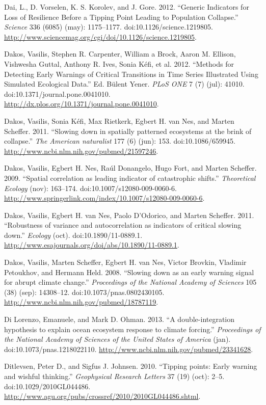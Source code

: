 \documentclass[author-year, review]{elsarticle} %
\begin{document}
Dai, L., D. Vorselen, K. S. Korolev, and J. Gore. 2012. ``Generic
Indicators for Loss of Resilience Before a Tipping Point Leading to
Population Collapse.'' \emph{Science} 336 (6085) (may): 1175--1177.
doi:10.1126/science.1219805.
\url{http://www.sciencemag.org/cgi/doi/10.1126/science.1219805}.

Dakos, Vasilis, Stephen R. Carpenter, William a Brock, Aaron M. Ellison,
Vishwesha Guttal, Anthony R. Ives, Sonia Kéfi, et al. 2012. ``Methods
for Detecting Early Warnings of Critical Transitions in Time Series
Illustrated Using Simulated Ecological Data.'' Ed. Bülent Yener.
\emph{PLoS ONE} 7 (7) (jul): 41010. doi:10.1371/journal.pone.0041010.
\url{http://dx.plos.org/10.1371/journal.pone.0041010}.

Dakos, Vasilis, Sonia Kéfi, Max Rietkerk, Egbert H. van Nes, and Marten
Scheffer. 2011. ``Slowing down in spatially patterned ecosystems at the
brink of collapse.'' \emph{The American naturalist} 177 (6) (jun): 153.
doi:10.1086/659945. \url{http://www.ncbi.nlm.nih.gov/pubmed/21597246}.

Dakos, Vasilis, Egbert H. Nes, Raúl Donangelo, Hugo Fort, and Marten
Scheffer. 2009. ``Spatial correlation as leading indicator of
catastrophic shifts.'' \emph{Theoretical Ecology} (nov): 163--174.
doi:10.1007/s12080-009-0060-6.
\url{http://www.springerlink.com/index/10.1007/s12080-009-0060-6}.

Dakos, Vasilis, Egbert H. van Nes, Paolo D'Odorico, and Marten Scheffer.
2011. ``Robustness of variance and autocorrelation as indicators of
critical slowing down.'' \emph{Ecology} (oct). doi:10.1890/11-0889.1.
\url{http://www.esajournals.org/doi/abs/10.1890/11-0889.1}.

Dakos, Vasilis, Marten Scheffer, Egbert H. van Nes, Victor Brovkin,
Vladimir Petoukhov, and Hermann Held. 2008. ``Slowing down as an early
warning signal for abrupt climate change.'' \emph{Proceedings of the
National Academy of Sciences} 105 (38) (sep): 14308--12.
doi:10.1073/pnas.0802430105.
\url{http://www.ncbi.nlm.nih.gov/pubmed/18787119}.

Di Lorenzo, Emanuele, and Mark D. Ohman. 2013. ``A double-integration
hypothesis to explain ocean ecosystem response to climate forcing.''
\emph{Proceedings of the National Academy of Sciences of the United
States of America} (jan). doi:10.1073/pnas.1218022110.
\url{http://www.ncbi.nlm.nih.gov/pubmed/23341628}.

Ditlevsen, Peter D., and Sigfus J. Johnsen. 2010. ``Tipping points:
Early warning and wishful thinking.'' \emph{Geophysical Research
Letters} 37 (19) (oct): 2--5. doi:10.1029/2010GL044486.
\url{http://www.agu.org/pubs/crossref/2010/2010GL044486.shtml}.
\end{document}
